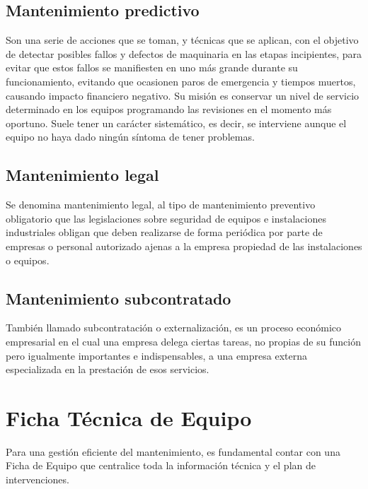 \documentclass[../main]{subfiles}
\begin{document}
\subsection{Mantenimiento predictivo}
Son una serie de acciones que se toman, y técnicas que se aplican,
con el objetivo de detectar posibles fallos y defectos de maquinaria
en las etapas incipientes, para evitar que estos fallos se
manifiesten en uno más grande durante su funcionamiento, evitando que
ocasionen paros de emergencia y tiempos muertos, causando impacto
financiero negativo. Su misión es conservar un nivel de servicio
determinado en los equipos programando las revisiones en el momento
más oportuno. Suele tener un carácter sistemático, es decir, se
interviene aunque el equipo no haya dado ningún síntoma de tener problemas.

\subsection{Mantenimiento legal}

Se denomina mantenimiento legal, al tipo de mantenimiento preventivo
obligatorio que las legislaciones sobre seguridad de equipos e
instalaciones industriales obligan que deben realizarse de forma
periódica por parte de empresas o personal autorizado ajenas a la
empresa propiedad de las instalaciones o equipos.

\subsection{Mantenimiento subcontratado}
También llamado subcontratación o externalización, es un proceso
económico empresarial en el cual una empresa delega ciertas tareas,
no propias de su función pero igualmente importantes e
indispensables, a una empresa externa especializada en la prestación
de esos servicios.

\section{Ficha Técnica de Equipo}

Para una gestión eficiente del mantenimiento, es fundamental contar con una Ficha de Equipo que centralice toda la información técnica y el plan de intervenciones.
\end{document}
